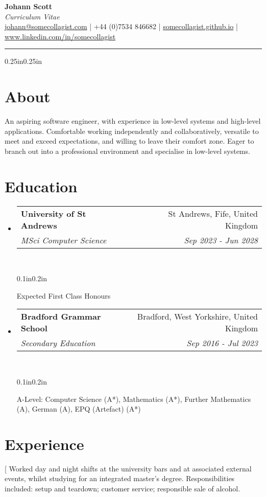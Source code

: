 \documentclass[a4paper]{article}
\makeatletter
\newcommand{\emailaddr}{johann@somecollagist.com}
\newcommand{\website}{somecollagist.github.io}
\newcommand{\linkedin}{www.linkedin.com/in/somecollagist}
\newcommand{\resumeSubheading}[5][]{
  \vspace{2pt}\item
    \begin{tabular*}{0.875\textwidth}[t]{l@{\extracolsep{\fill}}r}
      \textbf{#2} & #3 \\
      \textit{\small#4} & \textit{\small #5} \\
    \end{tabular*}\\
    \vspace{-5pt}
    \begin{adjustwidth}{0.1in}{0.2in}
      #1
    \end{adjustwidth}
    \vspace{10pt}
}
\newcommand{\resumeSubheadingList}[1]{
  \begin{itemize}
    #1
  \end{itemize}
}
\makeatother
\begin{document}
\begin{center}
  \huge \textbf{Johann Scott} \\
  \normalsize \textit{Curriculum Vitae} \\
  \vspace{1em}
  {
    \href{mailto:\emailaddr}{\emailaddr} {|}
    +44 (0)7534 846682 {|}
    \href{https://\website}{\website} {|}
    \href{https://\linkedin}{\linkedin}
  } \\
  \vspace{1em}
  \rule{\linewidth}{1pt}
\end{center}

\begin{adjustwidth}{0.25in}{0.25in}

  \section{About}
  An aspiring software engineer, with experience in low-level systems and
  high-level applications. Comfortable working independently and
  collaboratively, versatile to meet and exceed expectations, and willing to
  leave their comfort zone. Eager to branch out into a professional environment
  and specialise in low-level systems.

  \section{Education}
    \resumeSubheadingList{
      \resumeSubheading[
        Expected First Class Honours
      ]
        {University of St Andrews}
        {St Andrews, Fife, United Kingdom}
        {MSci Computer Science}
        {Sep 2023 {-} Jun 2028}
      \resumeSubheading[
        A-Level: Computer Science (A*), Mathematics (A*), Further
        Mathematics (A), German (A), EPQ (Artefact) (A*)
      ]
        {Bradford Grammar School}
        {Bradford, West Yorkshire, United Kingdom}
        {Secondary Education}
        {Sep 2016 {-} Jul 2023}
    }

  \section{Experience}
    \resumeSubheadingList{
      \resumeSubheading[
        Worked day and night shifts at the university bars and at associated
        external events, whilst studying for an integrated master's degree.
        Responsibilities included: setup and teardown; customer service;
        responsible sale of alcohol.

}
\end{adjustwidth}
\end{document}
